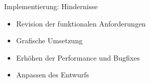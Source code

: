 \begin{frame}{Implementierung: Hindernisse}
    \begin{itemize}
      \item Revision der funktionalen Anforderungen
      \pause
      \item Grafische Umsetzung
      \pause
      \item Erhöhen der Performance und Bugfixes
      \pause
      \item Anpassen des Entwurfs
    \end{itemize}
\end{frame} 